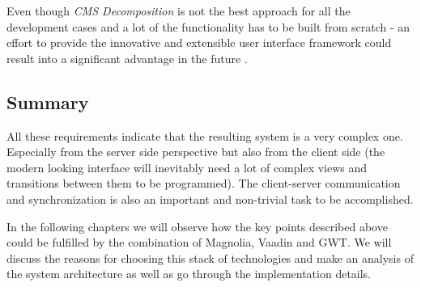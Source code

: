 Even though \emph{CMS Decomposition} is not the best approach for all the
development cases and a lot of the functionality has to be built from scratch -
an effort to provide the innovative and extensible user interface framework
could result into a significant advantage in the future \cite{cms_decomposition}.

\subsection{Summary}

All these requirements indicate that the resulting system is a very complex one.
Especially from the server side perspective but also from the client side (the
modern looking interface will inevitably need a lot of complex views and
transitions between them to be programmed). The client-server communication and
synchronization is also an important and non-trivial task to be accomplished.

In the following chapters we will observe how the key points described above
could be fulfilled by the combination of Magnolia, Vaadin and GWT. We will
discuss the reasons for choosing this stack of technologies and make an analysis
of the system architecture as well as go through the implementation details.

 \pagebreak